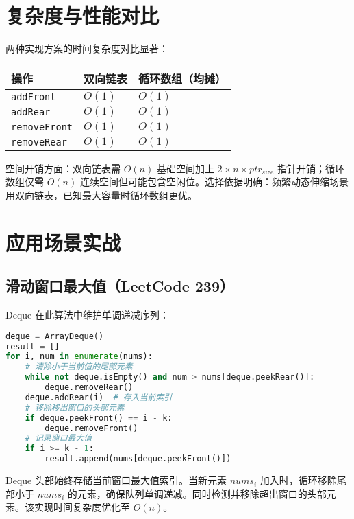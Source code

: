 \chapter{复杂度与性能对比}
两种实现方案的时间复杂度对比显著：\par
\begin{table}[H]
\centering
\begin{tabular}{|l|l|l|}
\hline
\textbf{操作} & \textbf{双向链表} & \textbf{循环数组（均摊）} \\
\hline
\texttt{addFront} & $O(1)$ & $O(1)$ \\
\hline
\texttt{addRear} & $O(1)$ & $O(1)$ \\
\hline
\texttt{removeFront} & $O(1)$ & $O(1)$ \\
\hline
\texttt{removeRear} & $O(1)$ & $O(1)$ \\
\hline
\end{tabular}
\end{table}
空间开销方面：双向链表需 $O(n)$ 基础空间加上 $2 \times n \times ptr_{size}$ 指针开销；循环数组仅需 $O(n)$ 连续空间但可能包含空闲位。选择依据明确：频繁动态伸缩场景用双向链表，已知最大容量时循环数组更优。\par
\chapter{应用场景实战}
\section{滑动窗口最大值（LeetCode 239）}
Deque 在此算法中维护单调递减序列：\par
\begin{lstlisting}[language=python]
deque = ArrayDeque()
result = []
for i, num in enumerate(nums):
    # 清除小于当前值的尾部元素
    while not deque.isEmpty() and num > nums[deque.peekRear()]:
        deque.removeRear()
    deque.addRear(i)  # 存入当前索引
    # 移除移出窗口的头部元素
    if deque.peekFront() == i - k:
        deque.removeFront()
    # 记录窗口最大值
    if i >= k - 1:
        result.append(nums[deque.peekFront()])
\end{lstlisting}
Deque 头部始终存储当前窗口最大值索引。当新元素 $nums_i$ 加入时，循环移除尾部小于 $nums_i$ 的元素，确保队列单调递减。同时检测并移除超出窗口的头部元素。该实现时间复杂度优化至 $O(n)$。\par
